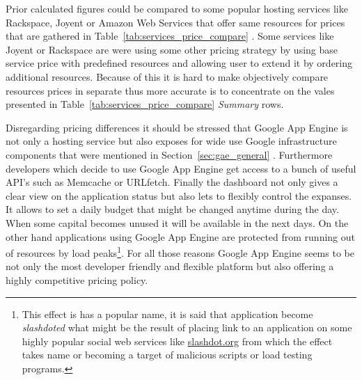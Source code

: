 Prior calculated figures could be compared to some popular hosting services like Rackspace, Joyent or Amazon Web Services that offer same resources for prices that are gathered in Table~\ref{tab:services_price_compare} . 
Some services like Joyent or Rackspace are were using some other pricing strategy by using base service price with predefined resources and allowing user to extend it by ordering additional resources. Because of this it is hard to make objectively compare resources prices in separate thus more accurate is to concentrate on the vales presented in Table~\ref{tab:services_price_compare} \emph{Summary} rows.    

Disregarding pricing differences it should be stressed that Google App Engine is not only a hosting service but also exposes for wide use Google infrastructure components that were mentioned in Section~\ref{sec:gae_general} . Furthermore developers which decide to use Google App Engine get access to a bunch of useful API's such as Memcache or URLfetch. Finally the dashboard not only gives a clear view on the application status but also lets to flexibly control the expanses. It allows to set a daily budget that might be changed anytime during the day. When some capital becomes unused it will be available in the next days. On the other hand applications using Google App Engine are protected  from running out of resources by load peaks\footnote{This effect is has a popular name, it is said that application become \emph{slashdoted} what might be the result of placing link to an application on some highly popular social web services like \url{slashdot.org} from which the effect takes name or becoming a target of malicious scripts or load testing programs.}. For all those reasons Google App Engine seems to be not only the most developer friendly and flexible platform but also offering a highly competitive pricing policy.   

